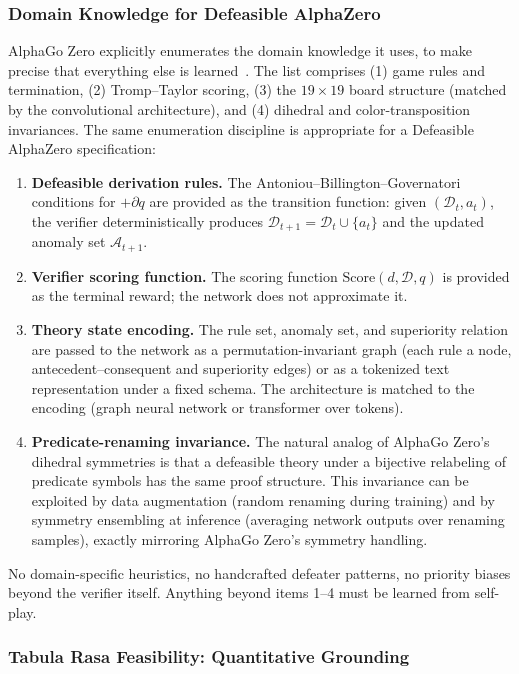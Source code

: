 \documentclass{article}
\newcommand{\D}{\mathcal{D}}
\newcommand{\Score}{\mathrm{Score}}
\begin{document}
\subsubsection{Domain Knowledge for Defeasible AlphaZero}

AlphaGo Zero explicitly enumerates the domain knowledge it uses, to make precise that everything else is learned~\cite{silver2017alphagozero}. The list comprises (1) game rules and termination, (2) Tromp--Taylor scoring, (3) the $19 \times 19$ board structure (matched by the convolutional architecture), and (4) dihedral and color-transposition invariances. The same enumeration discipline is appropriate for a Defeasible AlphaZero specification:

\begin{enumerate}[nosep]
    \item \textbf{Defeasible derivation rules.} The Antoniou--Billington--Governatori conditions for $+\partial q$ are provided as the transition function: given $(\D_t, a_t)$, the verifier deterministically produces $\D_{t+1} = \D_t \cup \{a_t\}$ and the updated anomaly set $\mathcal{A}_{t+1}$.
    \item \textbf{Verifier scoring function.} The scoring function $\Score(d, \D, q)$ is provided as the terminal reward; the network does not approximate it.
    \item \textbf{Theory state encoding.} The rule set, anomaly set, and superiority relation are passed to the network as a permutation-invariant graph (each rule a node, antecedent--consequent and superiority edges) or as a tokenized text representation under a fixed schema. The architecture is matched to the encoding (graph neural network or transformer over tokens).
    \item \textbf{Predicate-renaming invariance.} The natural analog of AlphaGo Zero's dihedral symmetries is that a defeasible theory under a bijective relabeling of predicate symbols has the same proof structure. This invariance can be exploited by data augmentation (random renaming during training) and by symmetry ensembling at inference (averaging network outputs over renaming samples), exactly mirroring AlphaGo Zero's symmetry handling.
\end{enumerate}

No domain-specific heuristics, no handcrafted defeater patterns, no priority biases beyond the verifier itself. Anything beyond items 1--4 must be learned from self-play.

\subsubsection{Tabula Rasa Feasibility: Quantitative Grounding}
\end{document}
